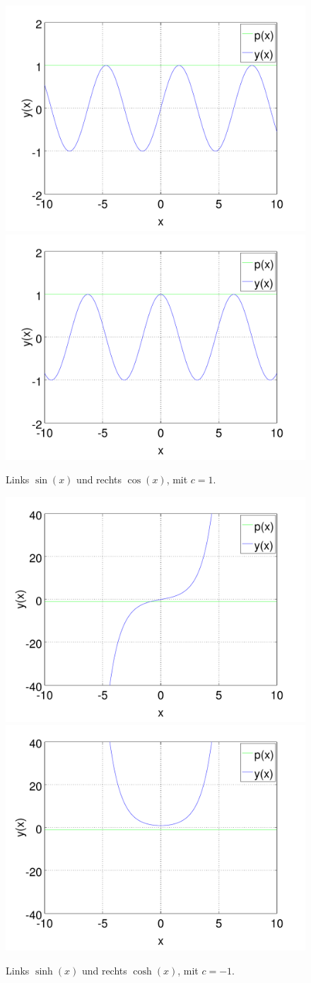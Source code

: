 \begin{figure}
	\includegraphics[width=0.5\hsize]{./wellen/images/basicfunctions/sin.pdf}
	\includegraphics[width=0.5\hsize]{./wellen/images/basicfunctions/cos.pdf}
	\caption{Links $\sin(x)$ und rechts $\cos(x)$, mit $c = 1$.}
	\label{fig:wellen:sin-cos}
\end{figure}

\begin{figure}
	\includegraphics[width=0.5\hsize]{./wellen/images/basicfunctions/sinh.pdf}
	\includegraphics[width=0.5\hsize]{./wellen/images/basicfunctions/cosh.pdf}
	\caption{Links $\sinh(x)$ und rechts $\cosh(x)$, mit $c = -1$.}
	\label{fig:wellen:sinh-cosh}
\end{figure}
